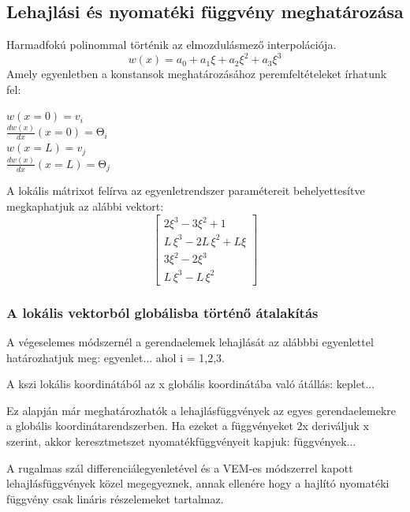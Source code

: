 \documentclass{article}
\begin{document}
	\subsection{Lehajlási és nyomatéki függvény meghatározása}
		Harmadfokú polinommal történik az elmozdulásmező interpolációja.
		\begin{equation}
			w(x)=a_0+a_1\xi+a_2\xi^2+a_3\xi^3
		\end{equation}
		Amely egyenletben a konstansok meghatározásához peremfeltételeket írhatunk fel:
	    \begin{center}
	    	$w\left(x=0\right)=v_i$\\
	    	$\frac{dw\left(x\right)}{dx}\left(x=0\right)=\mathrm{\Theta}_i$\\
	    	$w\left(x=L\right)=v_j$\\
	    	$\frac{dw\left(x\right)}{dx}\left(x=L\right)=\mathrm{\Theta}_j$\\	
	    \end{center}
		A lokális mátrixot felírva az egyenletrendszer paramétereit behelyettesítve megkaphatjuk az alábbi vektort:
		\begin{equation}
			\begin{bmatrix}2 {{\xi}^{3}}-3 {{\xi}^{2}}+1\\
			L\, {{\xi}^{3}}-2 L\, {{\xi}^{2}}+L \xi\\
			3 {{\xi}^{2}}-2 {{\xi}^{3}}\\
			L\, {{\xi}^{3}}-L\, {{\xi}^{2}}\end{bmatrix}
		\end{equation}
		
	\subsubsection{A lokális vektorból globálisba történő átalakítás}	
		A végeselemes módszernél a gerendaelemek lehajlását az alábbbi egyenlettel határozhatjuk meg:
		egyenlet...
		ahol i = 1,2,3.
		
		A kszi lokális koordinátából az x globális koordinátába való átállás:
		keplet...
		
		Ez alapján már meghatározhatók a lehajlásfüggvények az egyes gerendaelemekre a globális koordinátarendszerben.
		Ha ezeket a függvényeket 2x deriváljuk x szerint, akkor keresztmetszet nyomatékfüggvényeit kapjuk:
		függvények...
		
		A rugalmas szál differenciálegyenletével és a VEM-es módszerrel kapott lehajlásfüggvények közel megegyeznek, annak ellenére hogy a hajlító nyomatéki függvény csak lináris részelemeket tartalmaz.
		
\end{document}
